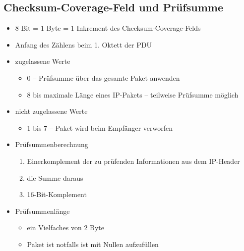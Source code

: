 \documentclass{beamer}
\begin{document}
\subsection{Checksum-Coverage-Feld und Prüfsumme}
\begin{frame}
\begin{itemize}
\item 8 Bit = 1 Byte = 1 Inkrement des Checksum-Coverage-Felds
\item Anfang des Zählens beim 1. Oktett der PDU
\item zugelassene Werte
	\begin{itemize}
	\item 0 -- Prüfsumme über das gesamte Paket anwenden
	\item $ 8 $ bis maximale Länge eines IP-Pakets -- teilweise Prüfsumme möglich
	\end{itemize}
\item nicht zugelassene Werte
	\begin{itemize}
	\item 1 bis 7 -- Paket wird beim Empfänger verworfen
	\end{itemize}
\item Prüfsummenberechnung
	\begin{enumerate}
	\item Einerkomplement der zu prüfenden Informationen aus dem IP-Header
	\item die Summe daraus
	\item 16-Bit-Komplement
	\end{enumerate}
	\item Prüfsummenlänge
		\begin{itemize}
		\item ein Vielfaches von 2 Byte
		\item Paket ist notfalls ist mit Nullen aufzufüllen
		\end{itemize}
\end{itemize}
\end{frame}

\end{document}
